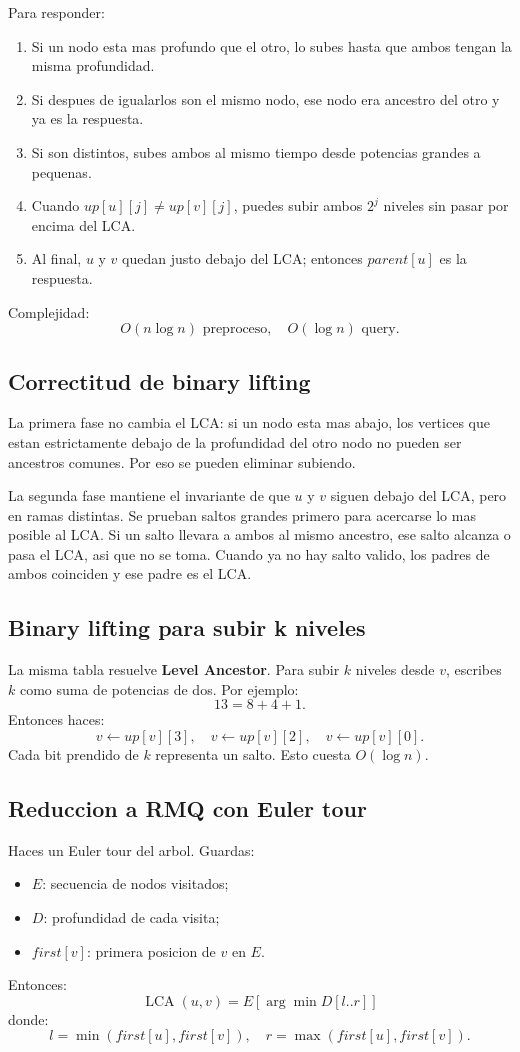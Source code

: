 \documentclass[10pt]{article}
\newcommand{\bigO}{O}
\newcommand{\LCA}{\operatorname{LCA}}
\begin{document}
Para responder:
\begin{enumerate}[leftmargin=*]
\item Si un nodo esta mas profundo que el otro, lo subes hasta que ambos tengan
la misma profundidad.
\item Si despues de igualarlos son el mismo nodo, ese nodo era ancestro del otro
y ya es la respuesta.
\item Si son distintos, subes ambos al mismo tiempo desde potencias grandes a
pequenas.
\item Cuando $up[u][j]\ne up[v][j]$, puedes subir ambos $2^j$ niveles sin pasar
por encima del LCA.
\item Al final, $u$ y $v$ quedan justo debajo del LCA; entonces $parent[u]$ es
la respuesta.
\end{enumerate}
Complejidad:
\[
\bigO(n\log n)\text{ preproceso},\quad \bigO(\log n)\text{ query}.
\]

\subsection{Correctitud de binary lifting}
La primera fase no cambia el LCA: si un nodo esta mas abajo, los vertices que
estan estrictamente debajo de la profundidad del otro nodo no pueden ser
ancestros comunes. Por eso se pueden eliminar subiendo.

La segunda fase mantiene el invariante de que $u$ y $v$ siguen debajo del LCA,
pero en ramas distintas. Se prueban saltos grandes primero para acercarse lo mas
posible al LCA. Si un salto llevara a ambos al mismo ancestro, ese salto alcanza
o pasa el LCA, asi que no se toma. Cuando ya no hay salto valido, los padres de
ambos coinciden y ese padre es el LCA.

\subsection{Binary lifting para subir k niveles}
La misma tabla resuelve \textbf{Level Ancestor}. Para subir $k$ niveles desde
$v$, escribes $k$ como suma de potencias de dos. Por ejemplo:
\[
13=8+4+1.
\]
Entonces haces:
\[
v\leftarrow up[v][3],\quad v\leftarrow up[v][2],\quad v\leftarrow up[v][0].
\]
Cada bit prendido de $k$ representa un salto. Esto cuesta $\bigO(\log n)$.

\subsection{Reduccion a RMQ con Euler tour}
Haces un Euler tour del arbol. Guardas:
\begin{itemize}[leftmargin=*]
\item $E$: secuencia de nodos visitados;
\item $D$: profundidad de cada visita;
\item $first[v]$: primera posicion de $v$ en $E$.
\end{itemize}
Entonces:
\[
\LCA(u,v)=E[\arg\min D[l..r]]
\]
donde:
\[
l=\min(first[u],first[v]),\quad r=\max(first[u],first[v]).
\]
\end{document}
